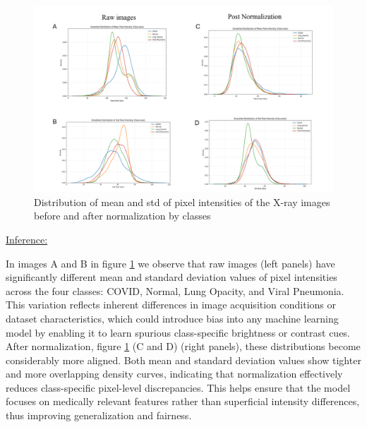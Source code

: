 \documentclass{article}
\begin{document}
\begin{figure}[h!] %
    \centering
    \includegraphics[width=1.0\linewidth]{Screenshot 2025-04-21 223200.png}
    \caption{Distribution of mean and std of pixel intensities of the X-ray images before and after normalization by classes}
    \label{fig:KDE_pre_post_normalization_class}
\end{figure}
\vspace{0.3cm}
\underline{Inference:}\

In images A and B in figure \ref{fig:KDE_pre_post_normalization_class} we observe that raw images (left panels) have significantly different mean and standard deviation values of pixel intensities across the four classes: COVID, Normal, Lung Opacity, and Viral Pneumonia. This variation reflects inherent differences in image acquisition conditions or dataset characteristics, which could introduce bias into any machine learning model by enabling it to learn spurious class-specific brightness or contrast cues. After normalization, figure  \ref{fig:KDE_pre_post_normalization_class} (C and D) (right panels), these distributions become considerably more aligned. Both mean and standard deviation values show tighter and more overlapping density curves, indicating that normalization effectively reduces class-specific pixel-level discrepancies. This helps ensure that the model focuses on medically relevant features rather than superficial intensity differences, thus improving generalization and fairness.
\end{document}
